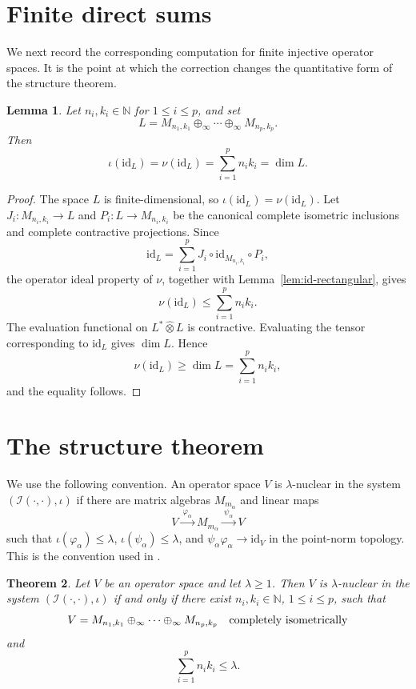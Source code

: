 \documentclass[11pt]{article}
\newtheorem{theorem}{Theorem}[section]
\newtheorem{lemma}[theorem]{Lemma}
\theoremstyle{remark}
\newcommand{\id}{\mathrm{id}}
\newcommand{\CI}{\mathcal I}
\newcommand{\ohat}{\widehat{\otimes}}
\begin{document}
\section{Finite direct sums}

We next record the corresponding computation for finite injective
operator spaces.  It is the point at which the correction changes the
quantitative form of the structure theorem.

\begin{lemma}\label{lem:id-sum}
Let \(n_i,k_i\in\mathbb N\) for \(1\leq i\leq p\), and set
\[
        L=M_{n_1,k_1}\oplus_\infty\cdots\oplus_\infty M_{n_p,k_p}.
\]
Then
\[
        \iota(\id_L)=\nu(\id_L)=\sum_{i=1}^{p} n_i k_i=\dim L.
\]
\end{lemma}

\begin{proof}
The space \(L\) is finite-dimensional, so \(\iota(\id_L)=\nu(\id_L)\).
Let \(J_i:M_{n_i,k_i}\to L\) and
\(P_i:L\to M_{n_i,k_i}\) be the canonical complete isometric inclusions
and complete contractive projections.  Since
\[
        \id_L=\sum_{i=1}^{p} J_i\circ \id_{M_{n_i,k_i}}\circ P_i,
\]
the operator ideal property of \(\nu\), together with
Lemma~\ref{lem:id-rectangular}, gives
\[
        \nu(\id_L)\leq \sum_{i=1}^{p} n_i k_i.
\]
The evaluation functional on \(L^{*}\ohat L\) is contractive.  Evaluating
the tensor corresponding to \(\id_L\) gives \(\dim L\).  Hence
\[
        \nu(\id_L)\geq \dim L=\sum_{i=1}^{p} n_i k_i,
\]
and the equality follows.
\end{proof}

\section{The structure theorem}

We use the following convention.  An operator space \(V\) is
\(\lambda\)-nuclear in the system \((\CI(\cdot,\cdot),\iota)\) if there
are matrix algebras \(M_{m_\alpha}\) and linear maps
\[
        V \xrightarrow{\ \varphi_\alpha\ } M_{m_\alpha}
        \xrightarrow{\ \psi_\alpha\ } V
\]
such that \(\iota(\varphi_\alpha)\leq \lambda\),
\(\iota(\psi_\alpha)\leq \lambda\), and
\(\psi_\alpha\varphi_\alpha\to \id_V\) in the point-norm topology.  This
is the convention used in \cite{DTZ}.

\begin{theorem}\label{thm:integral-structure}
Let \(V\) be an operator space and let \(\lambda\geq 1\).  Then \(V\) is
\(\lambda\)-nuclear in the system \((\CI(\cdot,\cdot),\iota)\) if and
only if there exist \(n_i,k_i\in\mathbb N\), \(1\leq i\leq p\), such that
\[
        V
        =
        M_{n_1,k_1}\oplus_\infty\cdots\oplus_\infty M_{n_p,k_p}
        \quad\hbox{completely isometrically}
\]
and
\[
        \sum_{i=1}^{p} n_i k_i\leq \lambda.
\]
\end{theorem}
\end{document}
